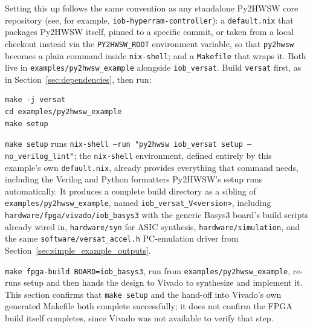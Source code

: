 Setting this up follows the same convention as any standalone Py2HWSW core repository (see, for example, \texttt{iob-hyperram-controller}): a \texttt{default.nix} that packages Py2HWSW itself, pinned to a specific commit, or taken from a local checkout instead via the \texttt{PY2HWSW\_ROOT} environment variable, so that \texttt{py2hwsw} becomes a plain command inside \texttt{nix-shell}; and a \texttt{Makefile} that wraps it. Both live in \texttt{examples/py2hwsw\_example} alongside \texttt{iob\_versat}. Build \texttt{versat} first, as in Section~\ref{sec:dependencies}, then run:

\begin{lstlisting}
make -j versat
cd examples/py2hwsw_example
make setup
\end{lstlisting}

\texttt{make setup} runs \texttt{nix-shell --run "py2hwsw iob\_versat setup --no\_verilog\_lint"}; the \texttt{nix-shell} environment, defined entirely by this example's own \texttt{default.nix}, already provides everything that command needs, including the Verilog and Python formatters Py2HWSW's setup runs automatically. It produces a complete build directory as a sibling of \texttt{examples/py2hwsw\_example}, named \texttt{iob\_versat\_V<version>}, including \texttt{hardware/fpga/vivado/iob\_basys3} with the generic Basys3 board's build scripts already wired in, \texttt{hardware/syn} for ASIC synthesis, \texttt{hardware/simulation}, and the same \texttt{software/versat\_accel.h} PC-emulation driver from Section~\ref{sec:simple_example_outputs}.

\texttt{make fpga-build BOARD=iob\_basys3}, run from \texttt{examples/py2hwsw\_example}, re-runs setup and then hands the design to Vivado to synthesize and implement it. This section confirms that \texttt{make setup} and the hand-off into Vivado's own generated Makefile both complete successfully; it does not confirm the FPGA build itself completes, since Vivado was not available to verify that step.
